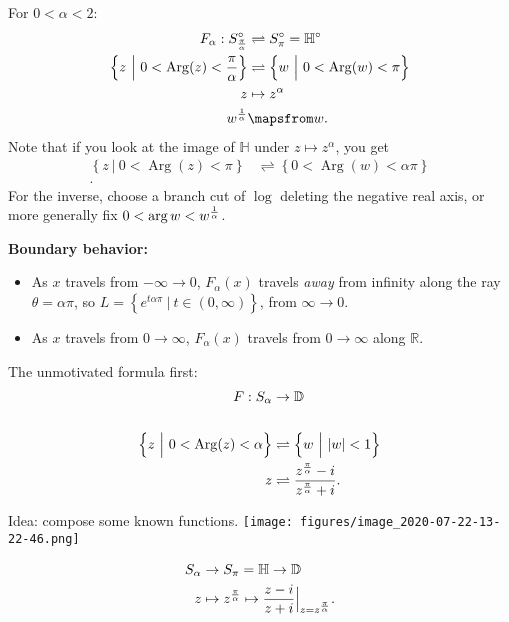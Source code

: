 \begin{proposition}

For \(0 < \alpha < 2\):
\begin{align*}
F_\alpha: S_{\pi \over \alpha }^\circ &\rightleftharpoons S_{\pi}^\circ = {\mathbb{H}}^\circ \\
\left\{{z{~\mathrel{\Big|}~}0 < \operatorname{Arg}(z) < {\pi\over \alpha} }\right\} &\rightleftharpoons\left\{{w{~\mathrel{\Big|}~}0 < \operatorname{Arg}(w) < \pi }\right\} \\
z &\mapsto z^\alpha \\
w^{1\over \alpha} &\mapsfrom w
.\end{align*}
Note that if you look at the image of \({\mathbb{H}}\) under
\(z\mapsto z^{\alpha}\), you get
\begin{align*}
\left\{{z {~\mathrel{\Big|}~}0 < \operatorname{Arg}(z) < \pi }\right\} &\rightleftharpoons\left\{{0 < \operatorname{Arg}(w) < \alpha \pi }\right\} \\
.\end{align*}
For the inverse, choose a branch cut of \(\log\) deleting the negative
real axis, or more generally fix \(0 < \arg w < w^{1\over \alpha}\).

\textbf{Boundary behavior:}

\begin{itemize}
\tightlist
\item
  As \(x\) travels from \(-\infty\to 0\), \(F_\alpha(x)\) travels
  \emph{away} from infinity along the ray \(\theta = \alpha \pi\), so
  \(L = \left\{{ e^{t \alpha \pi } {~\mathrel{\Big|}~}t\in (0, \infty) }\right\}\),
  from \(\infty\to 0\).
\item
  As \(x\) travels from \(0\to \infty\), \(F_\alpha(x)\) travels from
  \(0\to \infty\) along \({\mathbb{R}}\).
\end{itemize}

\end{proposition}

\begin{proposition}

The unmotivated formula first:
\begin{align*}
F: S_{\alpha} &\to {\mathbb{D}}\\ \\
\left\{{ z {~\mathrel{\Big|}~}0 < \operatorname{Arg}(z) < \alpha }\right\} &\rightleftharpoons\left\{{ w {~\mathrel{\Big|}~}{\left\lvert {w} \right\rvert} < 1 }\right\} \\
z &\rightleftharpoons{z^{\pi\over \alpha} - i \over z^{\pi\over\alpha} + i}
.\end{align*}

Idea: compose some known functions.
\texttt{[image: figures/image\_2020-07-22-13-22-46.png]}

\begin{align*}
S_{\alpha} &\to S_{\pi} = {\mathbb{H}}\to {\mathbb{D}}\\
z &\mapsto z^{\pi \over \alpha} \mapsto {z-i\over z+i}\Big|_{z= z^{\pi\over \alpha}}
.\end{align*}

\end{proposition}


